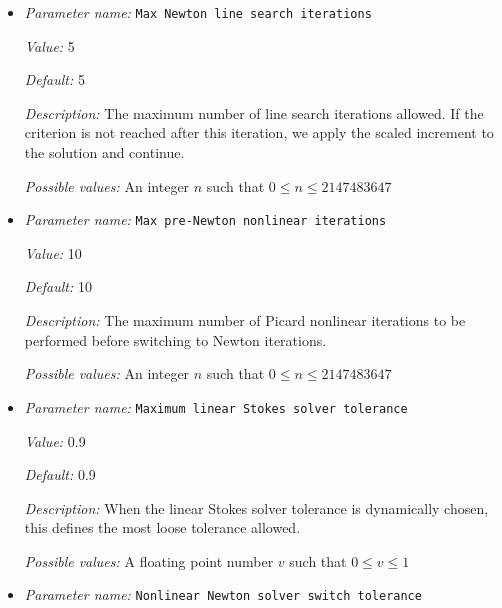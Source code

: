 \begin{itemize}
\item {\it Parameter name:} {\tt Max Newton line search iterations}
\label{parameters:Solver parameters/Newton solver parameters/Max Newton line search iterations}


{\it Value:} 5


{\it Default:} 5


{\it Description:} The maximum number of line search iterations allowed. If the criterion is not reached after this iteration, we apply the scaled increment to the solution and continue.


{\it Possible values:} An integer $n$ such that $0\leq n \leq 2147483647$
\item {\it Parameter name:} {\tt Max pre-Newton nonlinear iterations}
\label{parameters:Solver parameters/Newton solver parameters/Max pre-Newton nonlinear iterations}


{\it Value:} 10


{\it Default:} 10


{\it Description:} The maximum number of Picard nonlinear iterations to be performed before switching to Newton iterations.


{\it Possible values:} An integer $n$ such that $0\leq n \leq 2147483647$
\item {\it Parameter name:} {\tt Maximum linear Stokes solver tolerance}
\label{parameters:Solver parameters/Newton solver parameters/Maximum linear Stokes solver tolerance}


{\it Value:} 0.9


{\it Default:} 0.9


{\it Description:} When the linear Stokes solver tolerance is dynamically chosen, this defines the most loose tolerance allowed.


{\it Possible values:} A floating point number $v$ such that $0 \leq v \leq 1$
\item {\it Parameter name:} {\tt Nonlinear Newton solver switch tolerance}
\label{parameters:Solver parameters/Newton solver parameters/Nonlinear Newton solver switch tolerance}



\end{itemize}
